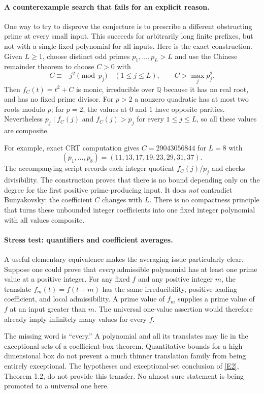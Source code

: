 \documentclass[11pt]{article}
\newcommand{\Q}{\mathbb{Q}}
\newcommand{\eref}[2]{\hyperlink{extra:#1:#2}{[E#2]}}
\begin{document}
\paragraph{A counterexample search that fails for an explicit reason.}
One way to try to disprove the conjecture is to prescribe a different
obstructing prime at every small input. This succeeds for arbitrarily long
finite prefixes, but not with a single fixed polynomial for all inputs.
Here is the exact construction. Given $L\ge1$, choose distinct odd primes
$p_1,\ldots,p_L>L$ and use the Chinese remainder theorem to choose $C>0$
with
\[
 C\equiv-j^2\pmod{p_j}\quad(1\le j\le L),\qquad
 C>\max_j p_j^2.
\]
Then $f_C(t)=t^2+C$ is monic, irreducible over $\Q$ because it has no real
root, and has no fixed prime divisor. For $p>2$ a nonzero quadratic has at
most two roots modulo $p$; for $p=2$, the values at $0$ and $1$ have opposite
parities. Nevertheless $p_j\mid f_C(j)$ and $f_C(j)>p_j$ for every
$1\le j\le L$, so all these values are composite.

For example, exact CRT computation gives $C=29043056844$ for $L=8$ with
\[
 (p_1,\ldots,p_8)=(11,13,17,19,23,29,31,37).
\]
The accompanying script records each integer quotient $f_C(j)/p_j$ and
checks divisibility. The construction proves that there is no bound depending
only on the degree for the first positive prime-producing input. It does
\emph{not} contradict Bunyakovsky: the coefficient $C$ changes with $L$.
There is no compactness principle that turns these unbounded integer
coefficients into one fixed integer polynomial with all values composite.

\paragraph{Stress test: quantifiers and coefficient averages.}
A useful elementary equivalence makes the averaging issue particularly clear.
Suppose one could prove that \emph{every} admissible polynomial has at least
one prime value at a positive integer. For any fixed $f$ and any positive
integer $m$, the translate $f_m(t)=f(t+m)$ has the same irreducibility,
positive leading coefficient, and local admissibility. A prime value of
$f_m$ supplies a prime value of $f$ at an input greater than $m$. The
universal one-value assertion would therefore already imply infinitely many
values for every $f$.

The missing word is ``every.'' A polynomial and all its translates may lie
in the exceptional sets of a coefficient-box theorem. Quantitative bounds
for a high-dimensional box do not prevent a much thinner translation family
from being entirely exceptional. The hypotheses and exceptional-set conclusion
of \eref{1292}{2}, Theorem 1.2, do not provide this transfer. No almost-sure
statement is being promoted to a universal one here.
\end{document}
